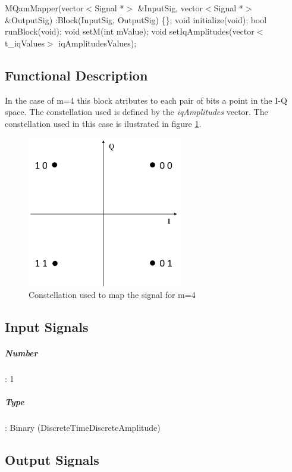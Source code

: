 MQamMapper(vector$<$Signal *$>$ \&InputSig, vector$<$Signal *$>$ \&OutputSig) :Block(InputSig, OutputSig) \{\};
\bigbreak	
void initialize(void);
\bigbreak	
bool runBlock(void);
\bigbreak	
void setM(int mValue);
\bigbreak	
void setIqAmplitudes(vector$<$t\_iqValues$>$ iqAmplitudesValues);

\subsection*{Functional Description}

In the case of m=4 this block atributes to each pair of bits a point in the I-Q space. The constellation used is defined by the \textit{iqAmplitudes} vector. The constellation used in this case is ilustrated in figure \ref{constellation}.

\begin{figure}
	\centering
	\includegraphics[width=0.6\textwidth]{./figures/MQAM_constellation}
	
	\caption{Constellation used to map the signal for m=4 }\label{constellation}
	
\end{figure}

\subsection*{Input Signals}

\subparagraph*{Number}: 1

\subparagraph*{Type}: Binary (DiscreteTimeDiscreteAmplitude)

\subsection*{Output Signals}

